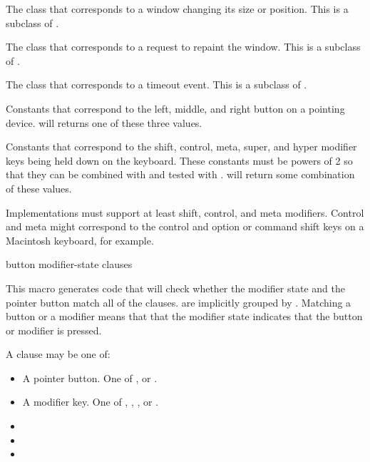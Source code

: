 
The class that corresponds to a window changing its size or position.  This is
a subclass of .


The class that corresponds to a request to repaint the window.  This is a
subclass of .



The class that corresponds to a timeout event.  This is a subclass of
.



Constants that correspond to the left, middle, and right button on a pointing
device.   will returns one of these three values.


Constants that correspond to the shift, control, meta, super, and hyper modifier
keys being held down on the keyboard.  These constants must be powers of 2 so
that they can be combined with  and tested with .
 will return some combination of these values.

Implementations must support at least shift, control, and meta modifiers.
Control and meta might correspond to the control and option or command shift
keys on a Macintosh keyboard, for example.

 {button modifier-state \body clauses}

This macro generates code that will check whether the modifier state
 and the pointer button  match all of the
clauses.   are implicitly grouped by .  Matching a button
or a modifier means that that the modifier state indicates that the button or
modifier is pressed.

A clause may be one of:

\begin{itemize}
\item A pointer button.  One of ,  or .

\item A modifier key.  One of , , ,
 or .

\item {}

\item {}

\item {}
\end{itemize}


